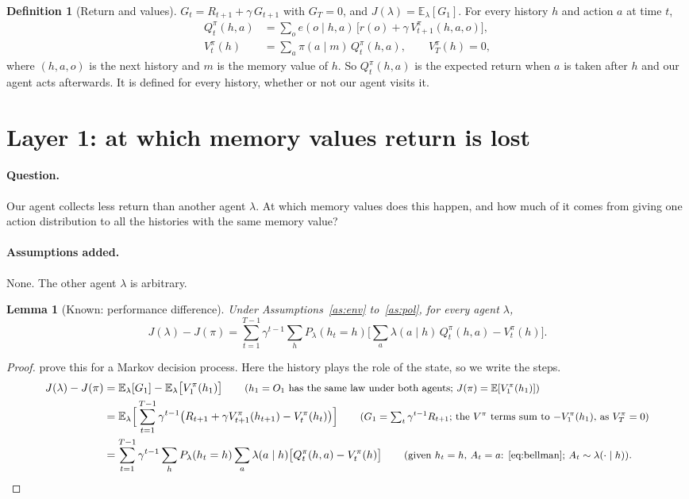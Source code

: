 \documentclass{article}
\newtheorem{lemma}[proposition]{Lemma}
\theoremstyle{definition}
\newtheorem{definition}[proposition]{Definition}
\numberwithin{equation}{section}
\newcommand{\E}{\mathbb{E}}
\newcommand{\why}[1]{\tag*{\small(#1)}}
\begin{document}
\begin{definition}[Return and values]\label{def:value}
$G_t=R_{t+1}+\gamma\,G_{t+1}$ with $G_T=0$, and $J(\lambda)=\E_\lambda[G_1]$. For every history $h$ and action $a$ at time $t$,
\begin{align}
Q^\pi_t(h,a)&=\sum_o e(o\mid h,a)\,\big[r(o)+\gamma\,V^\pi_{t+1}(h,a,o)\big], \label{eq:bellman}\\
V^\pi_t(h)&=\sum_a\pi(a\mid m)\,Q^\pi_t(h,a),\qquad V^\pi_T(h)=0, \nonumber
\end{align}
where $(h,a,o)$ is the next history and $m$ is the memory value of $h$. So $Q^\pi_t(h,a)$ is the expected return when $a$ is taken after $h$ and our agent acts afterwards. It is defined for every history, whether or not our agent visits it.
\end{definition}

\section{Layer 1: at which memory values return is lost}\label{sec:layer1}

\paragraph{Question.} Our agent collects less return than another agent $\lambda$. At which memory values does this happen, and how much of it comes from giving one action distribution to all the histories with the same memory value?

\paragraph{Assumptions added.} None. The other agent $\lambda$ is arbitrary.

\begin{lemma}[Known: performance difference]\label{lem:pdl}
Under Assumptions~\ref{as:env} to~\ref{as:pol}, for every agent $\lambda$,
\[
J(\lambda)-J(\pi)=\sum_{t=1}^{T-1}\gamma^{t-1}\sum_hP_\lambda(h_t=h)\Big[\sum_a\lambda(a\mid h)\,Q^\pi_t(h,a)-V^\pi_t(h)\Big].
\]
\end{lemma}

\begin{proof}
\citet{kakade2002cpi} prove this for a Markov decision process. Here the history plays the role of the state, so we write the steps.
\begin{align*}
J(\lambda)-J(\pi)
&=\E_\lambda[G_1]-\E_\lambda\big[V^\pi_1(h_1)\big] \why{$h_1=O_1$ has the same law under both agents; $J(\pi)=\E[V^\pi_1(h_1)]$}\\
&=\E_\lambda\Big[\sum_{t=1}^{T-1}\gamma^{t-1}\big(R_{t+1}+\gamma V^\pi_{t+1}(h_{t+1})-V^\pi_t(h_t)\big)\Big] \why{$G_1=\sum_t\gamma^{t-1}R_{t+1}$; the $V^\pi$ terms sum to $-V^\pi_1(h_1)$, as $V^\pi_T=0$}\\
&=\sum_{t=1}^{T-1}\gamma^{t-1}\sum_hP_\lambda(h_t=h)\sum_a\lambda(a\mid h)\big[Q^\pi_t(h,a)-V^\pi_t(h)\big] \why{given $h_t=h$, $A_t=a$: \eqref{eq:bellman}; $A_t\sim\lambda(\cdot\mid h)$}.
\end{align*}
\end{proof}
\end{document}
